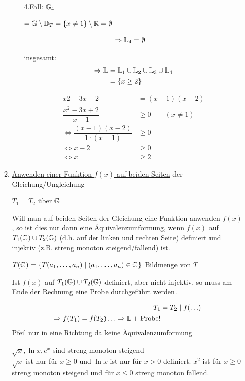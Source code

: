 \begin{itemize}
\begin{enumerate}
\begin{enumerate}
			\ul{4.Fall:} $\mathbb{G}_4$\parbox[t]{5cm}{$=\mathbb{G}\setminus \mathbb{D}_T \\=\{x\ne1\}\setminus\mathbb{R} \\= \emptyset$}
			\begin{align*}
			\Rightarrow\mathbb{L}_4 &=\emptyset
			\end{align*}
			
			\ul{insgesamt:}
			\begin{align*}
			\Rightarrow\mathbb{L} &=\mathbb{L}_1\cup\mathbb{L}_2\cup\mathbb{L}_3\cup\mathbb{L}_4\\
			&= \{x\ge2\}
			\end{align*}
			
			\Bem
			\begin{align*}
			x2-3x+2 &= (x-1)(x-2)\\
			\dfrac{x^2 -3x +2}{x-1} &\ge 0 \qquad(x\ne1)\\
			\Leftrightarrow \dfrac{(x-1)(x-2)}{1\cdot(x-1)} &\ge 0\\
			\Leftrightarrow x-2 &\ge 0\\
			\Leftrightarrow x &\ge 2
			\end{align*}
		\end{enumerate}
		
		\item \ul{Anwenden einer Funktion $f(x)$ auf beiden Seiten} der Gleichung/Ungleichung
		
		 $T_1=T_2$ über $\mathbb{G}$
		
		Will man auf beiden Seiten der Gleichung eine Funktion anwenden $f(x)$, so ist dies nur dann eine Äquivalenzumformung, wenn $f(x)$ auf $T_1(\mathbb{G})\cup T_2(\mathbb{G})$ (d.h. auf der linken und rechten Seite) definiert und injektiv (z.B. streng monoton steigend/fallend) ist.
		
		$T(\mathbb{G})=\{T(a_1,\ldots,a_n)\mid(a_1,\ldots,a_n)\in\mathbb{G}\}$ Bildmenge von $T$
		
		Ist $f(x)$ auf $T_1(\mathbb{G})\cup T_2(\mathbb{G})$ definiert, aber nicht injektiv, so muss am Ende der Rechnung eine \ul{Probe} durchgeführt werden.
		
		\begin{align*}
		T_1 &= T_2\mid f(\ldots)\\
		\Rightarrow f(T_1)=f(T_2)\ldots \Rightarrow \mathbb{L} + \text{Probe!}
		\end{align*}
		Pfeil nur in eine Richtung da keine Äquivalenzumformung
		
		\Bsp 
		$\sqrt{x}, \ln x, e^x$ sind streng monoton steigend\\
		\Beachte $\sqrt{x}$ ist nur für $x\ge0$ und $\ln x$ ist nur für $x>0$ definiert. $x^2$ ist für $x\ge0$ streng monoton steigend und für $x\le0$ streng monoton fallend.
		

\end{enumerate}
\end{itemize}
